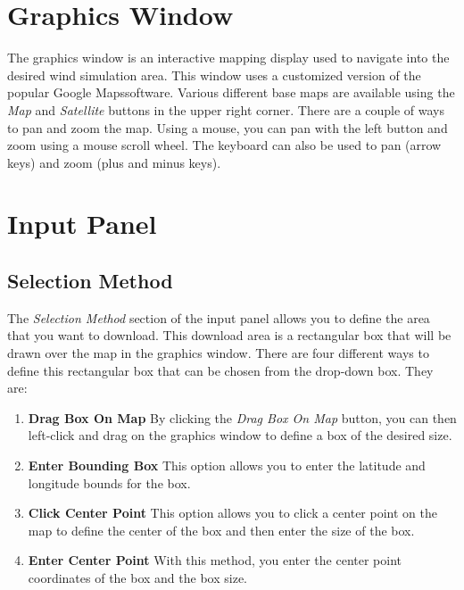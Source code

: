 \documentclass[12pt]{article}
\begin{document}
\section*{Graphics Window}
The graphics window is an interactive mapping display used to navigate into the desired wind simulation area.  This window uses a customized version of the popular Google Maps\texttrademark  software.  Various different base maps are available using the \textit{Map} and \textit{Satellite} buttons in the upper right corner.  There are a couple of ways to pan and zoom the map.  Using a mouse, you can pan with the left button and zoom using a mouse scroll wheel.  The keyboard can also be used to pan (arrow keys) and zoom (plus and minus keys).


\section*{Input Panel}
\subsection*{Selection Method}

The \textit{Selection Method} section of the input panel allows you to define the area that you want to download. This download area is a rectangular box that will be drawn over the map in the graphics window.  There are four different ways to define this rectangular box that can be chosen from the drop-down box.  They are:

\begin{enumerate}

\item \textbf{Drag Box On Map} \newline
	By clicking the \textit{Drag Box On Map} button, you can then left-click and drag on 		the graphics window to define a box of the desired size.

\item \textbf{Enter Bounding Box}\newline
	This option allows you to enter the latitude and longitude bounds for the box.
 
\item \textbf{Click Center Point} \newline
	This option allows you to click a center point on the map to define the center of the 		box and then enter the size of the box.
	
\item \textbf{Enter Center Point} \newline
	With this method, you enter the center point coordinates of the box and the box size.
\end{enumerate}
\end{document}
